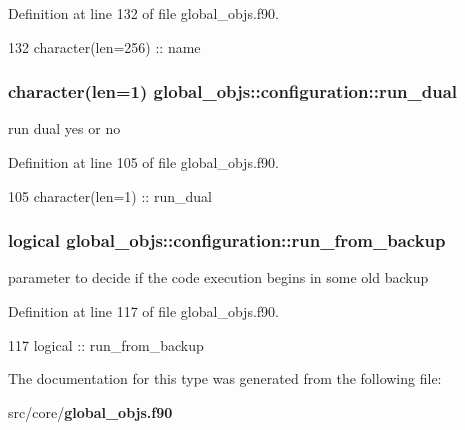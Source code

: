 Definition at line 132 of file global\+\_\+objs.\+f90.


\begin{DoxyCode}
132     \textcolor{keywordtype}{character(len=256)} :: name
\end{DoxyCode}
\subsubsection[{run\+\_\+dual}]{\setlength{\rightskip}{0pt plus 5cm}character(len=1) global\+\_\+objs\+::configuration\+::run\+\_\+dual}\label{structglobal__objs_1_1configuration_a54d3c72339b590d252d8318adfa8d9ac}


run dual yes or no 



Definition at line 105 of file global\+\_\+objs.\+f90.


\begin{DoxyCode}
105     \textcolor{keywordtype}{character(len=1)}    :: run\_dual
\end{DoxyCode}
\subsubsection[{run\+\_\+from\+\_\+backup}]{\setlength{\rightskip}{0pt plus 5cm}logical global\+\_\+objs\+::configuration\+::run\+\_\+from\+\_\+backup}\label{structglobal__objs_1_1configuration_a1d682a93b522ffe3ef026c20858216c0}


parameter to decide if the code execution begins in some old backup 



Definition at line 117 of file global\+\_\+objs.\+f90.


\begin{DoxyCode}
117     \textcolor{keywordtype}{logical}    :: run\_from\_backup
\end{DoxyCode}


The documentation for this type was generated from the following file\+:\begin{DoxyCompactItemize}
\item 
src/core/{\bf global\+\_\+objs.\+f90}\end{DoxyCompactItemize}
